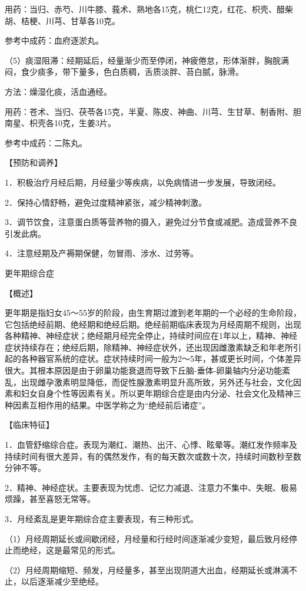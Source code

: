 \documentclass[12pt,UTF8,openany]{ctexbook}
\begin{document}
用药：当归、赤芍、川牛膝、莪术、熟地各15克，桃仁12克，红花、枳壳、醋柴胡、桔梗、川芎、甘草各10克。

参考中成药：血府逐淤丸。

（5）痰湿阻滞：经期延后，经量渐少而至停闭，神疲倦怠，形体渐胖，胸脘满闷，食少痰多，带下量多，色白质稠，舌质淡胖、苔白腻，脉滑。

方法：燥湿化痰，活血通经。

用药：苍术、当归、茯苓各15克，半夏、陈皮、神曲、川芎、生甘草、制香附、胆南星、枳壳各10克，生姜3片。

参考中成药：二陈丸。

【预防和调养】

1．积极治疗月经后期，月经量少等疾病，以免病情进一步发展，导致闭经。

2．保持心情舒畅，避免过度精神紧张，减少精神刺激。

3．调节饮食，注意蛋白质等营养物的摄入，避免过分节食或减肥。造成营养不良引发此病。

4．注意经期及产褥期保健，勿冒雨、涉水、过劳等。





更年期综合症


【概述】

更年期是指妇女45～55岁的阶段，由生育期过渡到老年期的一个必经的生命阶段，它包括绝经前期、绝经期和绝经后期。绝经前期临床表现为月经周期不规则，出现各种精神、神经症状；绝经期月经完全停止，持续时间应在1年以上，精神、神经症状持续存在；绝经后期，除精神、神经症状外，还出现因雌激素缺乏和年老所引起的各种器官系统的症状。症状持续时间一般为2～5年，甚或更长时间，个体差异很大。其根本原因是由于卵巢功能衰退而导致下丘脑-垂体-卵巢轴内分泌功能紊乱，出现雌孕激素明显降低，而促性腺激素明显升高所致，另外还与社会，文化因素和妇女自身个性等因素有关。所以更年期综合症是由内分泌、社会文化及精神三种因素互相作用的结果。中医学称之为“绝经前后诸症”。

【临床特征】

1．血管舒缩综合症。表现为潮红、潮热、出汗、心悸、眩晕等。潮红发作频率及持续时间有很大差异，有的偶然发作，有的每天数次或数十次，持续时间数秒至数分钟不等。

2．精神、神经症状。主要表现为忧虑、记忆力减退、注意力不集中、失眠、极易烦躁，甚至喜怒无常等。

3．月经紊乱是更年期综合症主要表现，有三种形式。

（1）月经周期延长或间歇闭经，月经量和行经时间逐渐减少变短，最后致月经停止而绝经，这是最常见的形式。

（2）月经周期缩短、频发，月经量多，甚至出现阴道大出血，经期延长或淋漓不止，以后逐渐减少至绝经。
\end{document}
